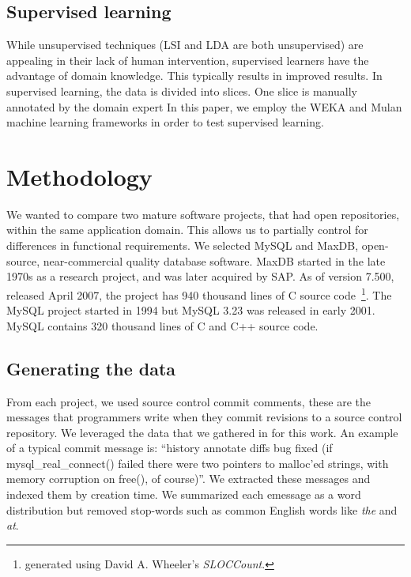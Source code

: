 \documentclass{acm_proc_article-sp}
\begin{document}
\subsection{Supervised learning}
While unsupervised techniques (LSI and LDA are both unsupervised) are appealing in their lack of human intervention, supervised learners have the advantage of domain knowledge. This typically results in improved results. In supervised learning, the data is divided into slices. One slice is manually annotated by the domain expert
In this paper, we employ the WEKA and Mulan machine learning frameworks in order to test supervised learning.
 
\section{Methodology}

\begin{comment}
\end{comment}

We wanted to compare two mature software projects, that had open repositories, within the same application domain. This allows us to partially control for differences in functional requirements. We selected MySQL and MaxDB, open-source, near-commercial quality database software. MaxDB started in the late 1970s as a research project, and was later acquired by SAP. As of version 7.500, released April 2007, the project has 940 thousand lines of C source code~\footnote{generated using David A. Wheeler's \emph{SLOCCount}.}.
The MySQL project started in 1994 but MySQL 3.23 was released in early 2001. MySQL contains 320 thousand lines of C and C++ source code. 

\subsection{Generating the data}
From each project, we used source control commit comments, these are the messages that programmers write when they commit revisions to a source control repository. We leveraged the data that we gathered in \cite{Hindle09ICSM} for this work. An example of a typical commit message is: ``history annotate diffs bug fixed (if mysql\_real\_connect() failed there were two pointers to malloc'ed strings, with memory corruption on free(), of course)''. We extracted these messages and indexed them by creation time. We summarized each emessage as a word distribution but removed stop-words such as   common English words like \emph{the} and \emph{at}.
\end{document}
